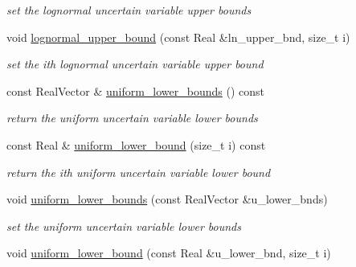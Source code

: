 \begin{DoxyCompactItemize}
\begin{DoxyCompactList}\small\item\em set the lognormal uncertain variable upper bounds \end{DoxyCompactList}\item 
void \hyperlink{classPecos_1_1AleatoryDistParams_ad13d40e54762e9843803d7ce46780af6}{lognormal\+\_\+upper\+\_\+bound} (const Real \&ln\+\_\+upper\+\_\+bnd, size\+\_\+t i)\label{classPecos_1_1AleatoryDistParams_ad13d40e54762e9843803d7ce46780af6}

\begin{DoxyCompactList}\small\item\em set the ith lognormal uncertain variable upper bound \end{DoxyCompactList}\item 
const Real\+Vector \& \hyperlink{classPecos_1_1AleatoryDistParams_a29cebf66493ffac6188b21ebf354ae4d}{uniform\+\_\+lower\+\_\+bounds} () const \label{classPecos_1_1AleatoryDistParams_a29cebf66493ffac6188b21ebf354ae4d}

\begin{DoxyCompactList}\small\item\em return the uniform uncertain variable lower bounds \end{DoxyCompactList}\item 
const Real \& \hyperlink{classPecos_1_1AleatoryDistParams_a49870b3282f1338f2ebd0ba53abbaca8}{uniform\+\_\+lower\+\_\+bound} (size\+\_\+t i) const \label{classPecos_1_1AleatoryDistParams_a49870b3282f1338f2ebd0ba53abbaca8}

\begin{DoxyCompactList}\small\item\em return the ith uniform uncertain variable lower bound \end{DoxyCompactList}\item 
void \hyperlink{classPecos_1_1AleatoryDistParams_a23e5ca671b97658335796d681a101c9c}{uniform\+\_\+lower\+\_\+bounds} (const Real\+Vector \&u\+\_\+lower\+\_\+bnds)\label{classPecos_1_1AleatoryDistParams_a23e5ca671b97658335796d681a101c9c}

\begin{DoxyCompactList}\small\item\em set the uniform uncertain variable lower bounds \end{DoxyCompactList}\item 
void \hyperlink{classPecos_1_1AleatoryDistParams_af25cab1b2bf42e8602d458e431f7d367}{uniform\+\_\+lower\+\_\+bound} (const Real \&u\+\_\+lower\+\_\+bnd, size\+\_\+t i)\label{classPecos_1_1AleatoryDistParams_af25cab1b2bf42e8602d458e431f7d367}


\end{DoxyCompactItemize}
